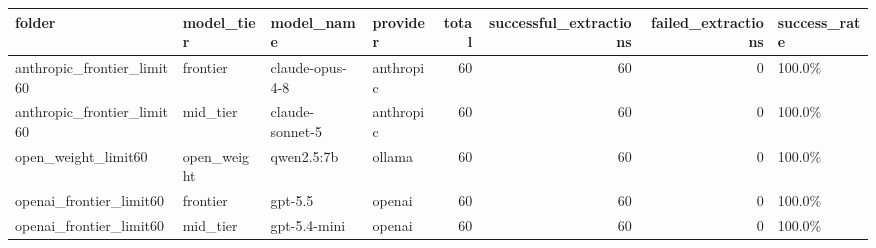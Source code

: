 \begin{tabular}{llllrrrl}
\toprule
folder & model\_tier & model\_name & provider & total & successful\_extractions & failed\_extractions & success\_rate \\
\midrule
anthropic\_frontier\_limit60 & frontier & claude-opus-4-8 & anthropic & 60 & 60 & 0 & 100.0\% \\
anthropic\_frontier\_limit60 & mid\_tier & claude-sonnet-5 & anthropic & 60 & 60 & 0 & 100.0\% \\
open\_weight\_limit60 & open\_weight & qwen2.5:7b & ollama & 60 & 60 & 0 & 100.0\% \\
openai\_frontier\_limit60 & frontier & gpt-5.5 & openai & 60 & 60 & 0 & 100.0\% \\
openai\_frontier\_limit60 & mid\_tier & gpt-5.4-mini & openai & 60 & 60 & 0 & 100.0\% \\
\bottomrule
\end{tabular}
